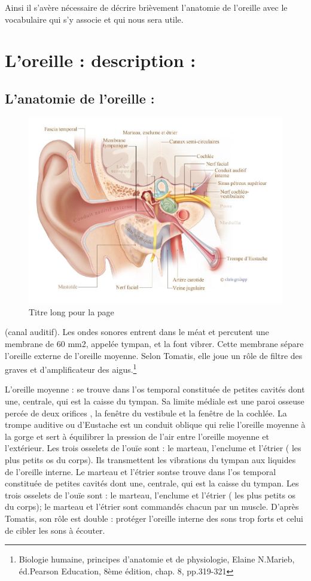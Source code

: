 Ainsi il s'avère nécessaire de décrire brièvement l'anatomie de l'oreille
avec le vocabulaire qui s'y associe et qui nous sera utile.

\section{L'oreille : description : }

\subsection{L'anatomie de l'oreille :}
\begin{figure}
	\centering
	\includegraphics[width=0.7\linewidth]{images/20160624Berufsfeldgruppen.jpg}
	\caption[Titre pour toc]{Titre long pour la page}
	\label{fig:-20160624berufsfeldgruppen}
\end{figure}


(canal auditif). Les ondes sonores entrent dans le méat et percutent
une membrane de 60 mm2, appelée tympan, et la font vibrer. Cette membrane
sépare l'oreille externe de l'oreille moyenne. Selon Tomatis, elle
joue un rôle de filtre des graves et d'amplificateur des aigus.\footnote{Biologie humaine, principes d'anatomie et de physiologie, Elaine N.Marieb,
éd.Pearson Education, 8ème édition, chap. 8, pp.319-321}

L'oreille moyenne : se trouve dans l'os temporal constituée de petites
cavités dont une, centrale, qui est la caisse du tympan. Sa limite
médiale est une paroi osseuse percée de deux orifices , la fenêtre
du vestibule et la fenêtre de la cochlée. La trompe auditive ou d'Eustache
est un conduit oblique qui relie l'oreille moyenne à la gorge et sert
à équilibrer la pression de l'air entre l'oreille moyenne et l'extérieur.
Les trois osselets de l'ouïe sont : le marteau, l'enclume et l'étrier
( les plus petits os du corps). Ils transmettent les vibrations du
tympan aux liquides de l'oreille interne. Le marteau et l'étrier sontse
trouve dans l'os temporal constituée de petites cavités dont une,
centrale, qui est la caisse du tympan. Les trois osselets de l'ouïe
sont : le marteau, l'enclume et l'étrier ( les plus petits os du corps);
le marteau et l'étrier sont commandés chacun par un muscle. D'après
Tomatis, son rôle est double : protéger l'oreille interne des sons
trop forts et celui de cibler les sons à écouter.


